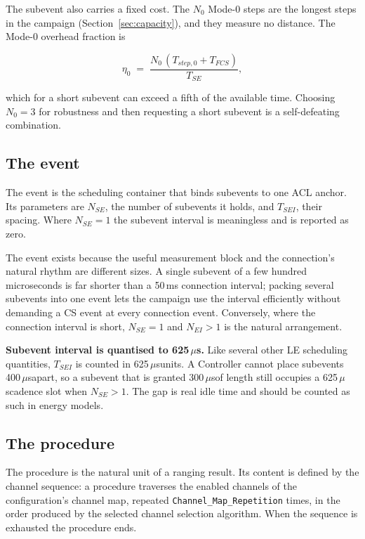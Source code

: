\documentclass[11pt,a4paper]{article}
\newcommand{\us}{\,\ensuremath{\upmu}s}
\newcommand{\code}[1]{\texttt{\small #1}}
\newcommand{\Tfcs}{T_{FCS}}
\newcommand{\Tse}{T_{SE}}
\newcommand{\Tsei}{T_{SEI}}
\newcommand{\Nse}{N_{SE}}
\newcommand{\Nei}{N_{EI}}
\providecommand{\upmu}{\mu}
\begin{document}
The subevent also carries a fixed cost. The $N_0$ Mode-0 steps are the longest steps in the campaign
(Section~\ref{sec:capacity}), and they measure no distance. The Mode-0 overhead fraction is

\begin{equation}
\eta_0 \;=\; \frac{N_0\,(T_{step,0} + \Tfcs)}{\Tse},
\label{eq:mode0overhead}
\end{equation}

which for a short subevent can exceed a fifth of the available time. Choosing $N_0 = 3$ for
robustness and then requesting a short subevent is a self-defeating combination.

\subsection{The event}

The event is the scheduling container that binds subevents to one ACL anchor. Its parameters are
$\Nse$, the number of subevents it holds, and $\Tsei$, their spacing. Where $\Nse = 1$ the subevent
interval is meaningless and is reported as zero.

The event exists because the useful measurement block and the connection's natural rhythm are
different sizes. A single subevent of a few hundred microseconds is far shorter than a 50\,ms
connection interval; packing several subevents into one event lets the campaign use the interval
efficiently without demanding a CS event at every connection event. Conversely, where the connection
interval is short, $\Nse = 1$ and $\Nei > 1$ is the natural arrangement.

\begin{callout}
\textbf{Subevent interval is quantised to 625\us.} Like several other LE scheduling quantities,
$\Tsei$ is counted in 625\us units. A Controller cannot place subevents 400\us apart, so a subevent
that is granted 300\us of length still occupies a 625\us cadence slot when $\Nse > 1$. The gap is
real idle time and should be counted as such in energy models.
\end{callout}

\subsection{The procedure}

The procedure is the natural unit of a ranging result. Its content is defined by the channel
sequence: a procedure traverses the enabled channels of the configuration's channel map, repeated
\code{Channel\_Map\_Repetition} times, in the order produced by the selected channel selection
algorithm. When the sequence is exhausted the procedure ends.
\end{document}
